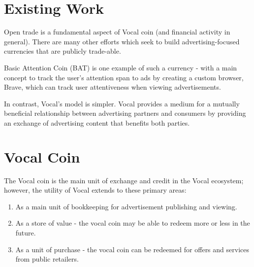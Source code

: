 \documentclass[conference]{IEEEtran}
\begin{document}
    \section{Existing Work}

    Open trade is a fundamental aspect of Vocal coin (and financial activity in general). There are many other efforts which seek to build advertising-focused currencies that are publicly trade-able.

    Basic Attention Coin (BAT) is one example of such a currency - with a main concept to track the user's attention span to ads by creating a custom browser, Brave, which can track user attentiveness when viewing advertisements. 

    In contrast, Vocal's model is simpler. Vocal provides a medium for a mutually beneficial relationship between advertising partners and consumers by providing an exchange of advertising content that benefits both parties.


    \section{Vocal Coin}


    The Vocal coin is the main unit of exchange and credit in the Vocal ecosystem; however, the utility of Vocal extends to these primary areas:

    \begin{enumerate}
      \item As a main unit of bookkeeping for advertisement publishing and viewing.
      \item As a store of value - the vocal coin may be able to redeem more or less in the future.
      \item As a unit of purchase - the vocal coin can be redeemed for offers and services from public retailers.
    \end{enumerate}
\end{document}
